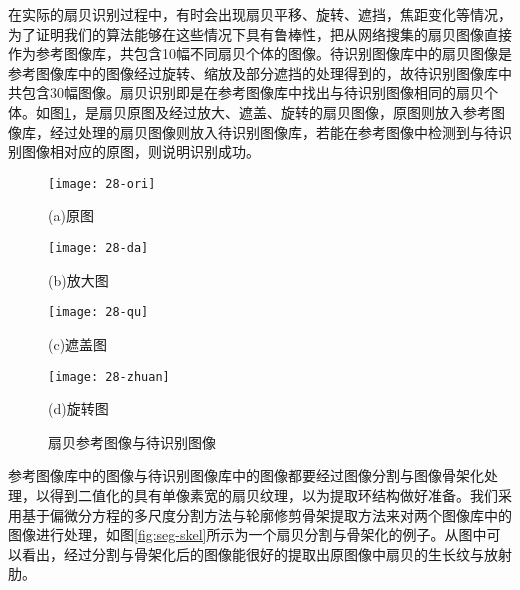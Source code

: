 在实际的扇贝识别过程中，有时会出现扇贝平移、旋转、遮挡，焦距变化等情况，为了证明我们的算法能够在这些情况下具有鲁棒性，把从网络搜集的扇贝图像直接作为参考图像库，共包含10幅不同扇贝个体的图像。待识别图像库中的扇贝图像是参考图像库中的图像经过旋转、缩放及部分遮挡的处理得到的，故待识别图像库中共包含30幅图像。扇贝识别即是在参考图像库中找出与待识别图像相同的扇贝个体。如图\ref{fig:process}，是扇贝原图及经过放大、遮盖、旋转的扇贝图像，原图则放入参考图像库，经过处理的扇贝图像则放入待识别图像库，若能在参考图像中检测到与待识别图像相对应的原图，则说明识别成功。

\begin{figure}
\centering
  \begin{minipage}[b]{0.48\textwidth} 
      \centering 
      \texttt{[image: 28-ori]}
        \centerline{(a)原图}\medskip
    \end{minipage}
  \begin{minipage}[b]{0.48\textwidth}
    \centering
    \texttt{[image: 28-da]}
      \centerline{(b)放大图}\medskip
    \end{minipage}
  \begin{minipage}[b]{0.48\textwidth} 
      \centering 
      \texttt{[image: 28-qu]}
        \centerline{(c)遮盖图}\medskip
    \end{minipage}
  \begin{minipage}[b]{0.48\textwidth}
    \centering
    \texttt{[image: 28-zhuan]}
      \centerline{(d)旋转图}\medskip
  \end{minipage}
\caption{扇贝参考图像与待识别图像}
\label{fig:process}
\end{figure}

参考图像库中的图像与待识别图像库中的图像都要经过图像分割与图像骨架化处理，以得到二值化的具有单像素宽的扇贝纹理，以为提取环结构做好准备。我们采用基于偏微分方程的多尺度分割方法与轮廓修剪骨架提取方法来对两个图像库中的图像进行处理，如图\ref{fig:seg-skel}所示为一个扇贝分割与骨架化的例子。从图中可以看出，经过分割与骨架化后的图像能很好的提取出原图像中扇贝的生长纹与放射肋。

